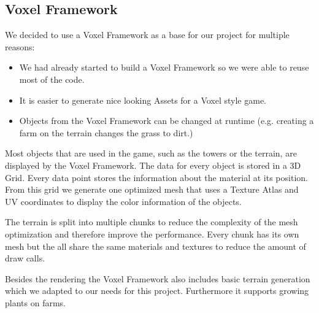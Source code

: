 \subsection{Voxel Framework}
\label{sec:implementation:voxelframework}

We decided to use a Voxel Framework as a base for our project for multiple reasons:
\begin{itemize}
	\item We had already started to build a Voxel Framework so we were able to reuse most of the code.
	\item It is easier to generate nice looking Assets for a Voxel style game.
	\item Objects from the Voxel Framework can be changed at runtime (e.g. creating a farm on the terrain changes the grass to dirt.)
\end{itemize}


Most objects that are used in the game, such as the towers or the terrain, are displayed by the Voxel Framework. The data for every object is stored in a 3D Grid. Every data point stores the information about the material at its position. From this grid we generate one optimized mesh that uses a Texture Atlas and UV coordinates to display the color information of the objects. 

The terrain is split into multiple chunks to reduce the complexity of the mesh optimization and therefore improve the performance. Every chunk has its own mesh but the all share the same materials and textures to reduce the amount of draw calls.

Besides the rendering the Voxel Framework also includes basic terrain generation which we adapted to our needs for this project. Furthermore it supports growing plants on farms.